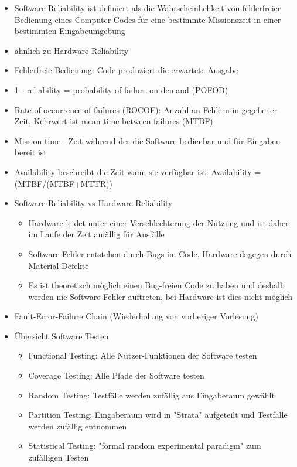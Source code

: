 \documentclass[paper=a4, fontsize=11pt]{scrartcl} %
\numberwithin{equation}{section} %
\numberwithin{figure}{section} %
\numberwithin{table}{section} %
\begin{document}
\begin{itemize}
  \item Software Reliability ist definiert als die Wahrscheinlichkeit von fehlerfreier Bedienung eines Computer Codes für eine bestimmte Missionszeit in einer bestimmten Eingabeumgebung
  \item ähnlich zu Hardware Reliability
  \item Fehlerfreie Bedienung: Code produziert die erwartete Ausgabe
  \item 1 - reliability = probability of failure on demand (POFOD)
  \item Rate of occurrence of failures (ROCOF): Anzahl an Fehlern in gegebener Zeit, Kehrwert ist mean time between failures (MTBF)
  \item Mission time - Zeit während der die Software bedienbar und für Eingaben bereit ist
  \item Availability beschreibt die Zeit wann sie verfügbar ist: Availability = (MTBF/(MTBF+MTTR))
  \item Software Reliability vs Hardware Reliability
  \begin{itemize}
    \item Hardware leidet unter einer Verschlechterung der Nutzung und ist daher im Laufe der Zeit anfällig für Ausfälle
    \item Software-Fehler entstehen durch Bugs im Code, Hardware dagegen durch Material-Defekte
    \item Es ist theoretisch möglich einen Bug-freien Code zu haben und deshalb werden nie Software-Fehler auftreten, bei Hardware ist dies nicht möglich
  \end{itemize}
  \item Fault-Error-Failure Chain (Wiederholung von vorheriger Vorlesung)
  \item Übersicht Software Testen
  \begin{itemize}
    \item Functional Testing: Alle Nutzer-Funktionen der Software testen
    \item Coverage Testing: Alle Pfade der Software testen
    \item Random Testing: Testfälle werden zufällig aus Eingaberaum gewählt
    \item Partition Testing: Eingaberaum wird in "Strata" aufgeteilt und Testfälle werden zufällig entnommen
    \item Statistical Testing: "formal random experimental paradigm" zum zufälligen Testen
  \end{itemize}

\end{itemize}
\end{document}
